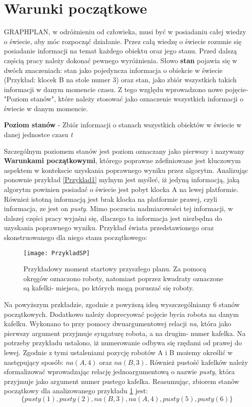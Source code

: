 \section{Warunki początkowe}
    GRAPHPLAN, w odróżnieniu od człowieka, musi być w posiadaniu całej wiedzy o świecie, aby móc rozpocząć działanie. Przez całą wiedzę o świecie rozumie się
    posiadanie informacji na temat każdego obiektu oraz jego stanu. Przed dalszą częścią pracy należy dokonać pewnego wyróżnienia. Słowo \textbf{stan} pojawia się w dwóch znaczeniach:
    stan jako pojedyncza informacja o obiekcie w świecie (Przykład: klocek B na stole numer 3) oraz stan, jako zbiór wszystkich takich informacji w danym momencie czasu.
    Z tego względu wprowadzono nowe pojęcie- "Poziom stanów", które należy stosować jako oznaczenie wszystkich informacji o świecie w danym momencie.
    \begin{definition}
        \label{PoziomStanow}
            \textbf{Poziom stanów} - Zbiór informacji o stanach wszystkich obiektów w świecie w danej jednostce czasu \textit{t}
        \end{definition}
    Szczególnym poziomem stanów jest poziom oznaczany jako pierwszy i nazywany \textbf{Warunkami początkowymi}, którego poprawne zdefiniowane jest kluczowym aspektem w kontekscie
    uzyskania poprawnego wyniku przez algorytm.
    Analizując ponownie przykład \ref{Przyklad1} mylnym jest myśleć, iż jedyną informacją, jaką algorytm powinien posiadać o świecie jest pobyt klocka A na lewej platformie. Również
    istotną informacją jest brak klocka na platformie prawej, czyli informacja, ze jest on \textit{pusty}. Mimo poczucia nadmiarowości tej informacji, w dalszej części pracy wyjaśni
    się, dlaczego ta informacja jest niezbędna do uzyskania poprawnego wyniku.
    Przykład świata przedstawionego oraz skonstruowanego dla niego stanu początkowego:
    \begin{figure}[H]
        \texttt{[image: PrzykladSP]}
        \centering
        \caption{Przykładowy moment startowy przyszłego planu. Za pomocą okręgów oznaczono roboty, natomiast poprzez kwadraty oznaczone są kafelki- miejsca,
        po których mogą poruszać się roboty.}
        \label{PrzykladSP}
    \end{figure}
    Na powyższym przkładzie, zgodnie z powyższą ideą wyszczególniamy 6 stanów początkowych. Dodatkowo należy doprecyować pojęcie bycia robota na danym kafelku. Wykonano to 
    przy pomocy dwuargumentowej relacji \textit{na}, która jako pierwszy argument przyjmuje syngaturę robota, a na drugim- numer kafelka. Na potrzeby przykładu ustalono, iż 
    numerowanie odbywa się rzędami od prawej do lewej. Zgodnie z tymi ustaleniami pozycję robotów A i B możemy określić w następujący sposób: \textit{$na(A,4)$} oraz 
    \textit{$na(B,3)$}. Również pustość kafelków należy sformalizować wprowadzając relację jednoargumentową o nazwie \textit{pusty}, która przyjmuje jako argument numer
    pustego kafelka. Reasumując, zbiorem stanów początkowy dla analizowanego przykładu \ref{PrzykladSP} jest: 
    \begin{equation}
        \{pusty(1),pusty(2),na(B,3),na(A,4),pusty(5),pusty(6)\}
        \label{ZbiorPoczatkowy}
    \end{equation}
